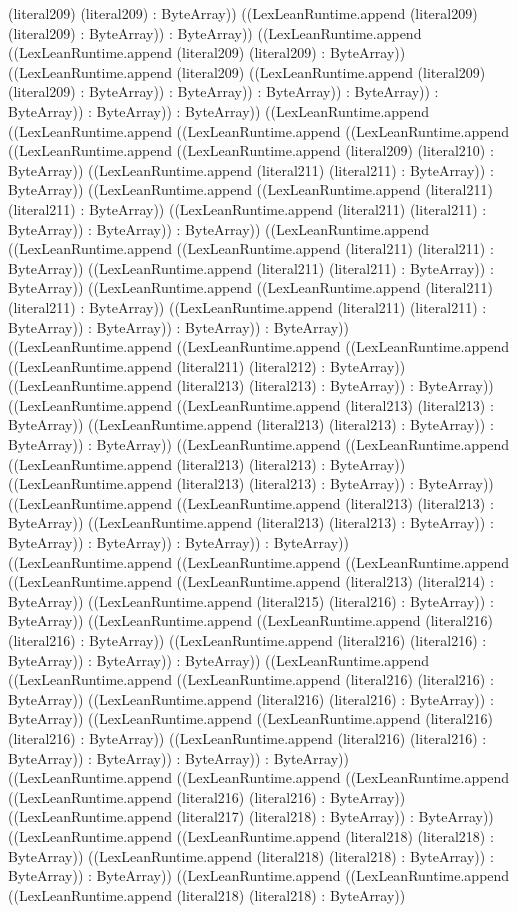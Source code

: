 \documentclass[11pt]{article}
\begin{document}
(literal209) (literal209) : ByteArray)) ((LexLeanRuntime.append (literal209) (literal209) : ByteArray)) : ByteArray)) ((LexLeanRuntime.append ((LexLeanRuntime.append (literal209) (literal209) : ByteArray)) ((LexLeanRuntime.append (literal209) ((LexLeanRuntime.append (literal209) (literal209) : ByteArray)) : ByteArray)) : ByteArray)) : ByteArray)) : ByteArray)) : ByteArray)) : ByteArray)) ((LexLeanRuntime.append ((LexLeanRuntime.append ((LexLeanRuntime.append ((LexLeanRuntime.append ((LexLeanRuntime.append ((LexLeanRuntime.append (literal209) (literal210) : ByteArray)) ((LexLeanRuntime.append (literal211) (literal211) : ByteArray)) : ByteArray)) ((LexLeanRuntime.append ((LexLeanRuntime.append (literal211) (literal211) : ByteArray)) ((LexLeanRuntime.append (literal211) (literal211) : ByteArray)) : ByteArray)) : ByteArray)) ((LexLeanRuntime.append ((LexLeanRuntime.append ((LexLeanRuntime.append (literal211) (literal211) : ByteArray)) ((LexLeanRuntime.append (literal211) (literal211) : ByteArray)) : ByteArray)) ((LexLeanRuntime.append ((LexLeanRuntime.append (literal211) (literal211) : ByteArray)) ((LexLeanRuntime.append (literal211) (literal211) : ByteArray)) : ByteArray)) : ByteArray)) : ByteArray)) ((LexLeanRuntime.append ((LexLeanRuntime.append ((LexLeanRuntime.append ((LexLeanRuntime.append (literal211) (literal212) : ByteArray)) ((LexLeanRuntime.append (literal213) (literal213) : ByteArray)) : ByteArray)) ((LexLeanRuntime.append ((LexLeanRuntime.append (literal213) (literal213) : ByteArray)) ((LexLeanRuntime.append (literal213) (literal213) : ByteArray)) : ByteArray)) : ByteArray)) ((LexLeanRuntime.append ((LexLeanRuntime.append ((LexLeanRuntime.append (literal213) (literal213) : ByteArray)) ((LexLeanRuntime.append (literal213) (literal213) : ByteArray)) : ByteArray)) ((LexLeanRuntime.append ((LexLeanRuntime.append (literal213) (literal213) : ByteArray)) ((LexLeanRuntime.append (literal213) (literal213) : ByteArray)) : ByteArray)) : ByteArray)) : ByteArray)) : ByteArray)) ((LexLeanRuntime.append ((LexLeanRuntime.append ((LexLeanRuntime.append ((LexLeanRuntime.append ((LexLeanRuntime.append (literal213) (literal214) : ByteArray)) ((LexLeanRuntime.append (literal215) (literal216) : ByteArray)) : ByteArray)) ((LexLeanRuntime.append ((LexLeanRuntime.append (literal216) (literal216) : ByteArray)) ((LexLeanRuntime.append (literal216) (literal216) : ByteArray)) : ByteArray)) : ByteArray)) ((LexLeanRuntime.append ((LexLeanRuntime.append ((LexLeanRuntime.append (literal216) (literal216) : ByteArray)) ((LexLeanRuntime.append (literal216) (literal216) : ByteArray)) : ByteArray)) ((LexLeanRuntime.append ((LexLeanRuntime.append (literal216) (literal216) : ByteArray)) ((LexLeanRuntime.append (literal216) (literal216) : ByteArray)) : ByteArray)) : ByteArray)) : ByteArray)) ((LexLeanRuntime.append ((LexLeanRuntime.append ((LexLeanRuntime.append ((LexLeanRuntime.append (literal216) (literal216) : ByteArray)) ((LexLeanRuntime.append (literal217) (literal218) : ByteArray)) : ByteArray)) ((LexLeanRuntime.append ((LexLeanRuntime.append (literal218) (literal218) : ByteArray)) ((LexLeanRuntime.append (literal218) (literal218) : ByteArray)) : ByteArray)) : ByteArray)) ((LexLeanRuntime.append ((LexLeanRuntime.append ((LexLeanRuntime.append (literal218) (literal218) : ByteArray)) 
\end{document}
